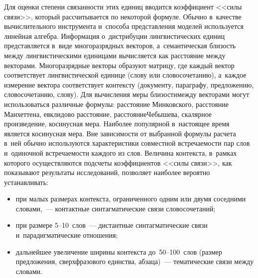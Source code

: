 \begin{multicols}{2}
     Для оценки степени связанности этих единиц вводится коэффициент
<<силы связи>>, который рассчитывается по некоторой формуле. Обычно в~качестве вычислительного инструмента и~способа представления моделей
используется линейная алгебра. Информация о~дистрибуции
лингвистических единиц представляется в~виде многоразрядных векторов, а~семантическая близость между лингвистическими единицами вычисляется
как расстояние между векторами. Многоразрядные векторы образуют
матрицу, где каждый вектор соответствует лингвистической единице (слову
или словосочетанию), а~каждое измерение вектора соответствует контексту
(документу, параграфу, предложению, словосочетанию, слову). Для
вычисления меры близости\linebreak между векторами могут использоваться
различные формулы: расстояние Минковского, расстояние Манхеттена,
евклидово расстояние, расстояние\linebreak Чебыше\-ва, скалярное произведение,
косинусная мера. Наиболее популярной в~настоящее время является
косинусная мера. Вне за\-ви\-си\-мости от выбранной формулы расчета в~ней
обычно используются характеристики совместной встречаемости пар слов и~одиночной встречаемости каждого из слов. Величина контекста, в~рамках
которого осуществляются подсчеты коэффициентов <<силы связи>>, как
показывают результаты исследований, позволяет наиболее вероятно
устанавливать:
     \begin{itemize}
     \item при малых размерах контекста, ограниченного одним или
двумя соседними словами,~--- контактные синтагматические связи
словосочетаний;
     \item при размере 5--10~слов~--- дистантные синтагматические
связи и~парадигматические отношения;
     \item дальнейшее увеличение ширины контекста до~50--100~слов
(размер предложения, сверхфразового единства, абзаца)~--- тематические
связи между словами.
     \end{itemize}


\end{multicols}
